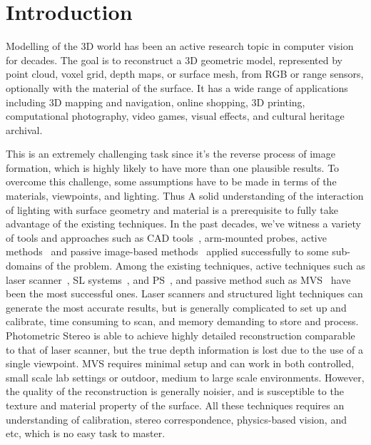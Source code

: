 
\chapter{Introduction}
\label{ch:Introduction}
Modelling of the 3D world has been an active research topic in computer vision for decades. The goal is to reconstruct a 3D geometric model, represented by point cloud, voxel grid, depth maps, or surface mesh, from RGB or range sensors, optionally with the material of the surface. It has a wide range of applications including 3D mapping and navigation, online shopping, 3D printing, computational photography, video games, visual effects, and cultural heritage archival.

This is an extremely challenging task since it's the reverse process of image formation, which is highly likely to have more than one plausible results. To overcome this challenge, some assumptions have to be made in terms of the materials, viewpoints, and lighting. Thus A solid understanding of the interaction of lighting with surface geometry and material is a prerequisite to fully take advantage of the existing techniques. In the past decades, we've witness a variety of tools and approaches such as \ac{CAD} tools~\cite{CAD}, arm-mounted probes, active methods~\cite{bernardini2002building,levoy2000digital,Lidar,kinect} and passive image-based methods~\cite{kutulakos2000theory,furukawa2010accurate,faugeras2002variational,goesele2006multi} applied successfully to some sub-domains of the problem. Among the existing techniques, active techniques such as laser scanner~\cite{levoy2000digital}, \ac{SL} systems~\cite{bernardini2002building}, and \ac{PS}~\cite{woodham1980photometric}, and passive method such as \ac{MVS}~\cite{seitz2006comparison} have been the most successful ones. Laser scanners and structured light techniques can generate the most accurate results, but is generally complicated to set up and calibrate, time consuming to scan, and memory demanding to store and process. Photometric Stereo is able to achieve highly detailed reconstruction comparable to that of laser scanner, but the true depth information is lost due to the use of a single viewpoint. MVS requires minimal setup and can work in both controlled, small scale lab settings or outdoor, medium to large scale environments. However, the quality of the reconstruction is generally noisier, and is susceptible to the texture and material property of the surface. All these techniques requires an understanding of calibration, stereo correspondence, physics-based vision, and etc, which is no easy task to master.

